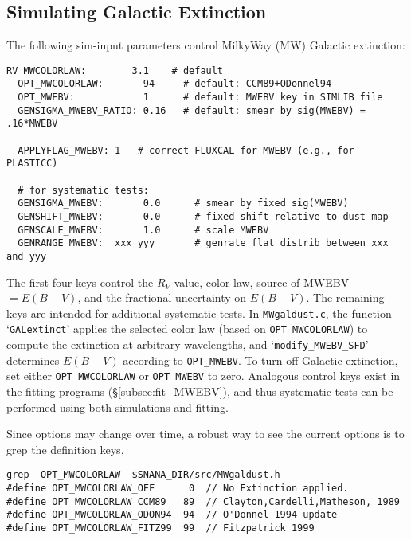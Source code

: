 \documentclass[12pt]{article}
\newcommand{\mwebv}{MWEBV}
\begin{document}
{%
   \clearpage
   \subsection{Simulating Galactic Extinction}
   \label{subsec:sim_MWEBV}

The following sim-input parameters control MilkyWay (MW) 
Galactic extinction:
%
\begin{Verbatim}[frame=single]
  RV_MWCOLORLAW:        3.1    # default
  OPT_MWCOLORLAW:       94     # default: CCM89+ODonnel94
  OPT_MWEBV:            1      # default: MWEBV key in SIMLIB file
  GENSIGMA_MWEBV_RATIO: 0.16   # default: smear by sig(MWEBV) = .16*MWEBV

  APPLYFLAG_MWEBV: 1   # correct FLUXCAL for MWEBV (e.g., for PLASTICC)

  # for systematic tests:
  GENSIGMA_MWEBV:       0.0      # smear by fixed sig(MWEBV) 
  GENSHIFT_MWEBV:       0.0      # fixed shift relative to dust map
  GENSCALE_MWEBV:       1.0      # scale MWEBV 
  GENRANGE_MWEBV:  xxx yyy       # genrate flat distrib between xxx and yyy
\end{Verbatim}
%
The first four keys control the $R_V$ value, color law, 
source of {\mwebv}$= E(B-V)$,
and the fractional uncertainty on $E(B-V)$. 
The remaining keys are intended for additional systematic tests.
In {\tt MWgaldust.c}, the function `{\tt GALextinct}'
applies the selected color law (based on {\tt OPT\_MWCOLORLAW}) 
to compute the extinction at arbitrary wavelengths,
and `{\tt modify\_MWEBV\_SFD}' determines $E(B-V)$
according to {\tt OPT\_MWEBV}.
To turn off Galactic extinction, set either
{\tt OPT\_MWCOLORLAW} or {\tt OPT\_MWEBV} to zero.
Analogous control keys exist in the fitting programs 
(\S\ref{subsec:fit_MWEBV}),
and thus systematic tests can be performed using
both simulations and fitting.

Since options may change over time, a robust
way to see the current options is to grep the definition keys,
%
\begin{Verbatim}[frame=single]
grep  OPT_MWCOLORLAW  $SNANA_DIR/src/MWgaldust.h
#define OPT_MWCOLORLAW_OFF      0  // No Extinction applied.
#define OPT_MWCOLORLAW_CCM89   89  // Clayton,Cardelli,Matheson, 1989
#define OPT_MWCOLORLAW_ODON94  94  // O'Donnel 1994 update 
#define OPT_MWCOLORLAW_FITZ99  99  // Fitzpatrick 1999


\end{Verbatim}}
\end{document}

